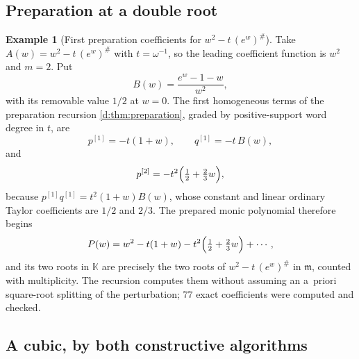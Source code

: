 \documentclass[11pt,a4paper]{article}
\numberwithin{equation}{section}
\theoremstyle{definition}
\newtheorem{example}[theorem]{Example}
\theoremstyle{remark}
\theoremstyle{plain}
\newcommand{\K}{\mathbb K}
\newcommand{\mm}{\mathfrak m}
\newcommand{\ev}[1]{#1^{\#}}
\begin{document}
\subsection{Preparation at a double root}\label{f:sub-prepexample}

\begin{example}[First preparation coefficients for
$w^{2}-t\,\ev{(e^{w})}$]\label{f:ex-prep}
Take $A(w)=w^{2}-t\,\ev{(e^{w})}$ with $t=\omega^{-1}$, so the leading
coefficient function is $w^{2}$ and $m=2$.  Put
\[
 B(w)=\frac{e^{w}-1-w}{w^{2}},
\]
with its removable value $1/2$ at $w=0$.  The first homogeneous terms of
the preparation recursion \ref{d:thm:preparation}, graded by
positive-support word degree in $t$, are
\[
 p^{[1]}=-t(1+w),\qquad q^{[1]}=-t\,B(w),
\]
and
\[
 p^{[2]}=-t^{2}\Bigl(\tfrac12+\tfrac23 w\Bigr),
\]
because $p^{[1]}q^{[1]}=t^{2}(1+w)B(w)$, whose constant and linear
ordinary Taylor coefficients are $1/2$ and $2/3$.  The prepared monic
polynomial therefore begins
\[
 P(w)=w^{2}-t(1+w)-t^{2}\Bigl(\tfrac12+\tfrac23w\Bigr)+\cdots,
\]
and its two roots in $\K$ are precisely the two roots of
$w^{2}-t\,\ev{(e^{w})}$ in $\mm$, counted with multiplicity.  The
recursion computes them without assuming an a~priori square-root
splitting of the perturbation; $77$ exact coefficients were computed and
checked.
\end{example}

\subsection{A cubic, by both constructive algorithms}\label{f:sub-cubic}
\end{document}
